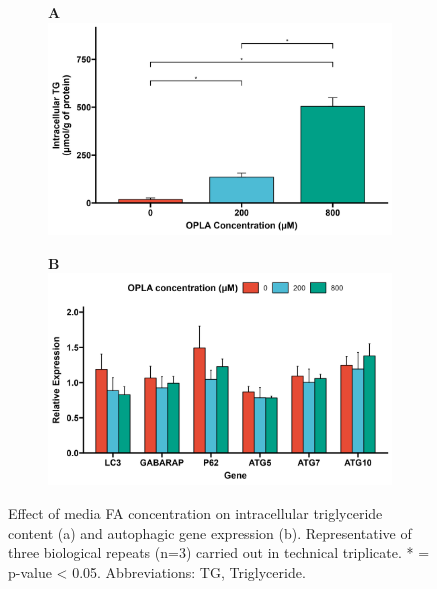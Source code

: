 \begin{figure}[h]
     \begin{subfigure}[b]{0.49\textwidth}
         \textbf{A}
         \centering
         \includegraphics[width=\textwidth]{figures/ch3-Model Development/LFHF TG.png}
     \end{subfigure}  
     \hfill
     \begin{subfigure}[b]{0.49\textwidth}
         \textbf{B}
         \centering
         \includegraphics[width=\textwidth]{figures/ch3-Model Development/LFHF ATG genes.png}
     \end{subfigure}
     \hfill
        \caption{Effect of media FA concentration on intracellular triglyceride content (a) and autophagic gene expression (b). Representative of three biological repeats (n=3) carried out in technical triplicate. * = p-value < 0.05. Abbreviations: TG, Triglyceride.}
        \label{fig:ch3-Model Development LFHF}
\end{figure}